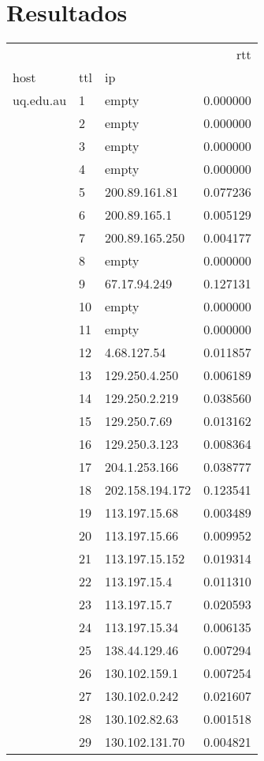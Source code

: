 \newpage
\section{Resultados}
\begin{center}
\begin{tabular}{lllr}
\toprule
              &    &                &       rtt \\
host & ttl & ip &           \\
\midrule
uq.edu.au & 1  & empty &  0.000000 \\
              & 2  & empty &  0.000000 \\
              & 3  & empty &  0.000000 \\
              & 4  & empty &  0.000000 \\
              & 5  & 200.89.161.81 &  0.077236 \\
              & 6  & 200.89.165.1 &  0.005129 \\
              & 7  & 200.89.165.250 &  0.004177 \\
              & 8  & empty &  0.000000 \\
              & 9  & 67.17.94.249 &  0.127131 \\
              & 10 & empty &  0.000000 \\
              & 11 & empty &  0.000000 \\
              & 12 & 4.68.127.54 &  0.011857 \\
              & 13 & 129.250.4.250 &  0.006189 \\
              & 14 & 129.250.2.219 &  0.038560 \\
              & 15 & 129.250.7.69 &  0.013162 \\
              & 16 & 129.250.3.123 &  0.008364 \\
              & 17 & 204.1.253.166 &  0.038777 \\
              & 18 & 202.158.194.172 &  0.123541 \\
              & 19 & 113.197.15.68 &  0.003489 \\
              & 20 & 113.197.15.66 &  0.009952 \\
              & 21 & 113.197.15.152 &  0.019314 \\
              & 22 & 113.197.15.4 &  0.011310 \\
              & 23 & 113.197.15.7 &  0.020593 \\
              & 24 & 113.197.15.34 &  0.006135 \\
              & 25 & 138.44.129.46 &  0.007294 \\
              & 26 & 130.102.159.1 &  0.007254 \\
              & 27 & 130.102.0.242 &  0.021607 \\
              & 28 & 130.102.82.63 &  0.001518 \\
              & 29 & 130.102.131.70 &  0.004821 \\
\bottomrule
\end{tabular}
\end{center}

